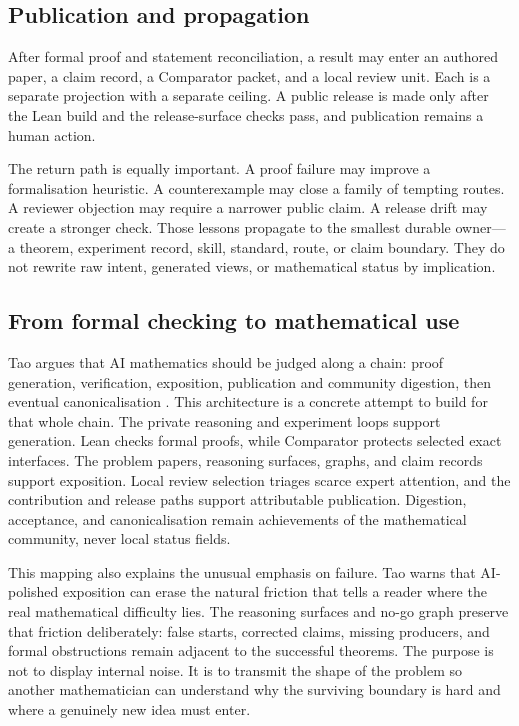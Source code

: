 \documentclass[10pt]{article}
\begin{document}
\subsection{Publication and propagation}

After formal proof and statement reconciliation, a result may enter an authored
paper, a claim record, a Comparator packet, and a local review unit. Each is a
separate projection with a separate ceiling. A public release is made only
after the Lean build and the release-surface checks pass, and publication
remains a human action.

The return path is equally important. A proof failure may improve a
formalisation heuristic. A counterexample may close a family of tempting
routes. A reviewer objection may require a narrower public claim. A release
drift may create a stronger check. Those lessons propagate to the smallest
durable owner---a theorem, experiment record, skill, standard, route, or claim
boundary. They do not rewrite raw intent, generated views, or mathematical
status by implication.

\subsection{From formal checking to mathematical use}

Tao argues that AI mathematics should be judged along a chain: proof
generation, verification, exposition, publication and community digestion,
then eventual canonicalisation \cite{taoai}. This architecture is a concrete
attempt to build for that whole chain. The private reasoning and experiment
loops support generation. Lean checks formal proofs, while Comparator protects
selected exact interfaces. The problem papers, reasoning surfaces, graphs, and
claim records support exposition. Local review selection triages scarce expert attention, and
the contribution and release paths support attributable publication. Digestion,
acceptance, and canonicalisation remain achievements of the mathematical
community, never local status fields.

This mapping also explains the unusual emphasis on failure. Tao warns that
AI-polished exposition can erase the natural friction that tells a reader
where the real mathematical difficulty lies. The reasoning surfaces and no-go
graph preserve that friction deliberately: false starts, corrected claims,
missing producers, and formal obstructions remain adjacent to the successful
theorems. The purpose is not to display internal noise. It is to transmit the
shape of the problem so another mathematician can understand why the surviving
boundary is hard and where a genuinely new idea must enter.
\end{document}
